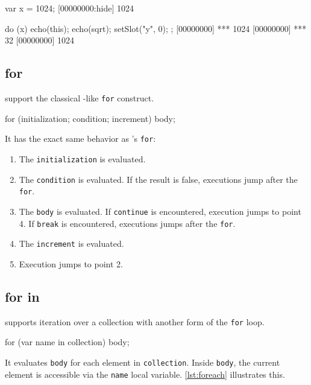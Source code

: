 \begin{urbiscript}[caption=Using \lstinline|do|, label=lst:do,
  float=\floatpos]
var x = 1024;
[00000000:hide] 1024

do (x)
{
  echo(this);
  echo(sqrt);
  setSlot("y", 0);
};
[00000000] *** 1024
[00000000] *** 32
[00000000] 1024
\end{urbiscript}

\subsection{for}

\us support the classical \C-like \lstinline|for| construct.

\begin{urbiscript}[frame=, backgroundcolor=, ]
for (initialization; condition; increment)
  body;
\end{urbiscript}

It has the exact same behavior as \C's \lstinline|for|:

\begin{enumerate}
\item The \lstinline|initialization| is evaluated.
\item The \lstinline|condition| is evaluated. If the result is false,
  executions jump after the \lstinline|for|.
\item The \lstinline|body| is evaluated. If \lstinline|continue| is
  encountered, execution jumps to point 4. If \lstinline|break| is
  encountered, executions jumps after the \lstinline|for|.
\item The \lstinline|increment| is evaluated.
\item Execution jumps to point 2.
\end{enumerate}

\subsection{for in}

\us supports iteration over a collection with another form of the
\lstinline|for| loop.

\begin{urbiscript}[frame=, backgroundcolor=, ]
for (var name in collection)
   body;
\end{urbiscript}

It evaluates \lstinline|body| for each element in
\lstinline|collection|. Inside \lstinline|body|, the current element
is accessible via the \lstinline|name| local
variable. \autoref{lst:foreach} illustrates this.



